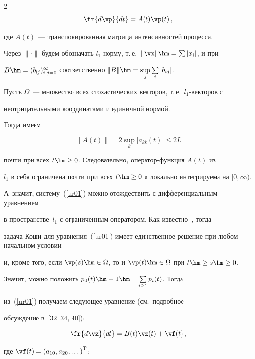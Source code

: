 \begin{multicols}{2}
\begin{equation}
\fr{d\vp}{dt}=A(t)\vp(t)\,,

\end{equation}

\noindent где $A(t)$~--- транспонированная матрица интенсивностей процесса.



Через $\|\cdot\|$  будем обозначать  $l_1$-нор\-му, т.\,е.\  $\|{\vx}\|\hm=\sum|x_i|$, и при

$B \hm= (b_{ij})_{i,j=0}^{\infty}$ соответственно $\|B\| \hm= \sup\limits_j \sum\limits_i |b_{ij}|$.

Пусть $\Omega$~--- множество всех стохастических векторов, т.\,е.\ $l_1$-век\-то\-ров с

неотрицательными координатами и единичной нормой.



Тогда имеем

$$\|A(t)\| = 2\sup_{k}\left|a_{kk}(t)\right| \le 2 L $$

почти при всех  $t \hm\ge 0$. Следовательно, опе\-ра\-тор-функ\-ция $A(t)$ из

$l_1$ в себя ограничена почти при всех $t \hm\ge 0$ и локально интегрируема на  $[0,\infty)$.

А~значит, сис\-те\-му~(\ref{ur01}) можно отождествить с дифференциальным уравнением

в пространстве~$l_1$ с ограниченным оператором. Как известно~\cite{DK}, тогда

задача Коши для уравнения~(\ref{ur01}) имеет единственное решение при любом начальном условии

и, кроме того, если   $\vp(s)\hm \in \Omega$, то и $\vp(t) \hm\in \Omega$ при $t \hm\ge s\hm \ge 0$.



Значит, можно положить  $p_0(t) \hm= 1\hm - \sum\limits_{i \ge 1} p_i(t)$. Тогда

из~(\ref{ur01}) получаем следующее уравнение (см.\ подробное

обсуждение в~[32--34, 40]):

\begin{equation}

\fr{d\vz}{dt}= B(t)\vz(t)+\vf(t)\,, \label{2.06}

\end{equation}

где $\vf(t)=\left(a_{10}, a_{20},\dots \right)^{\mathrm{T}}$;

{ %

\begin{equation}


\end{equation}}
\end{multicols}
